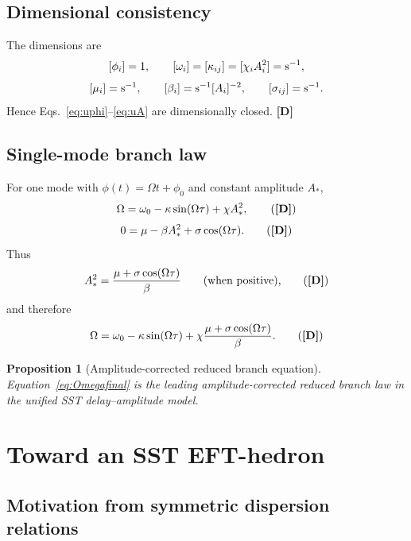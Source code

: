 \documentclass[11pt]{article}
\newcommand{\TagD}{\textbf{[D]}} %
\theoremstyle{definition}
\theoremstyle{plain}
\newtheorem{proposition}[definition]{Proposition}
\begin{document}
\subsection{Dimensional consistency}

The dimensions are
\[
[\phi_i]=1,\qquad [\omega_i]=[\kappa_{ij}]=[\chi_iA_i^2]={\rm s}^{-1},
\]
\[
[\mu_i]={\rm s}^{-1},\qquad [\beta_i]={\rm s}^{-1}[A_i]^{-2},\qquad [\sigma_{ij}]={\rm s}^{-1}.
\]
Hence Eqs.~\eqref{eq:uphi}--\eqref{eq:uA} are dimensionally closed. \hfill \TagD

\subsection{Single-mode branch law}

For one mode with \(\phi(t)=\Omega t+\phi_0\) and constant amplitude \(A_\ast\),
\begin{equation}
\Omega
=
\omega_0-\kappa\sin(\Omega\tau)+\chi A_\ast^2,
\tag{\TagD}
\label{eq:Omega1}
\end{equation}
\begin{equation}
0=\mu-\beta A_\ast^2+\sigma\cos(\Omega\tau).
\tag{\TagD}
\label{eq:Aeq}
\end{equation}
Thus
\begin{equation}
A_\ast^2=\frac{\mu+\sigma\cos(\Omega\tau)}{\beta}
\qquad\text{(when positive),}
\tag{\TagD}
\label{eq:Astar}
\end{equation}
and therefore
\begin{equation}
\Omega
=
\omega_0-\kappa\sin(\Omega\tau)
+
\chi\frac{\mu+\sigma\cos(\Omega\tau)}{\beta}.
\tag{\TagD}
\label{eq:Omegafinal}
\end{equation}

\begin{proposition}[Amplitude-corrected reduced branch equation]
Equation~\eqref{eq:Omegafinal} is the leading amplitude-corrected reduced branch law in the unified SST delay--amplitude model.
\end{proposition}

\section{Toward an SST EFT-hedron}\label{sec:efthedron}

\subsection{Motivation from symmetric dispersion relations}
\end{document}

